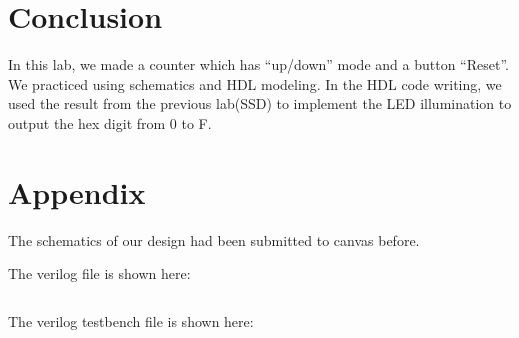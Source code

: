 \documentclass{article}
\begin{document}
\newpage

\section{Conclusion}
In this lab, we made a counter which has “up/down” mode and a button “Reset”. We practiced using schematics and  HDL modeling. In the HDL code writing, we used the result from the previous lab(SSD) to implement the LED illumination to output the hex digit from 0 to F.

\section{Appendix}
The schematics of our design had been submitted to canvas before.

The verilog file is shown here:
\inputminted{verilog}{../lab4/counter_verilog.v}

The verilog testbench file is shown here:
\inputminted{verilog}{../lab4/counter_test.v}
\end{document}
